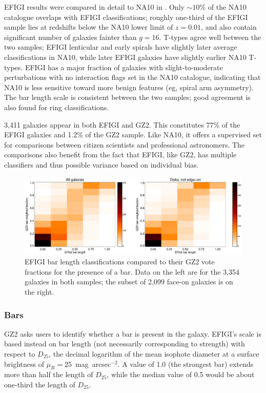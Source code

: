 \documentclass[useAMS,usenatbib]{mn2e}
\begin{document}
EFIGI results were compared in detail to NA10 in \citet{bai11}. Only $\sim10\%$ of the NA10 catalogue overlaps with EFIGI classifications; roughly one-third of the EFIGI sample lies at redshifts below the NA10 lower limit of $z=0.01$, and also contain significant number of galaxies fainter than $g=16$. T-types agree well between the two samples; EFIGI lenticular and early spirals have slightly later average classifications in NA10, while later EFIGI galaxies have slightly earlier NA10 T-types. EFIGI has a major fraction of galaxies with slight-to-moderate perturbations with no interaction flags set in the NA10 catalogue, indicating that NA10 is less sensitive toward more benign features (eg, spiral arm asymmetry). The bar length scale is consistent between the two samples; good agreement is also found for ring classifications. 

3,411 galaxies appear in both EFIGI and GZ2. This constitutes 77\% of the EFIGI galaxies and 1.2\% of the GZ2 sample. Like NA10, it offers a supervised set for comparisons between citizen scientists and professional astronomers. The comparisons also benefit from the fact that EFIGI, like GZ2, has multiple classifiers and thus possible variance based on individual bias. 

\begin{figure}
\includegraphics[angle=0,width=7.0in]{figures/efigi_bars.eps}
\caption{EFIGI bar length classifications compared to their GZ2 vote fractions for the presence of a bar. Data on the left are for the 3,354 galaxies in both samples; the subset of 2,099 face-on galaxies is on the right. 
\label{fig-efigi_bars}}
\end{figure}

\subsubsection{Bars}

GZ2 asks users to identify whether a bar is present in the galaxy. EFIGI's scale is based instead on bar length (not necessarily corresponding to strength) with respect to $D_{25}$, the decimal logarithm of the mean isophote diameter at a surface brightness of $\mu_B=25$~mag~arcsec$^{-2}$. A value of 1.0 (the strongest bar) extends more than half the length of $D_{25}$, while the median value of 0.5 would be about one-third the length of $D_{25}$. 
\end{document}
